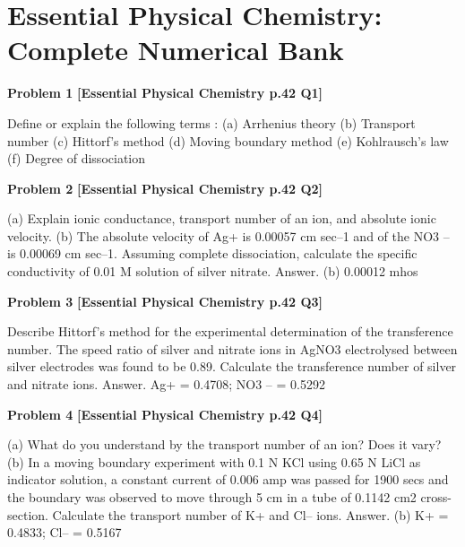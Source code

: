 \chapter{Essential Physical Chemistry: Complete Numerical Bank}
\label{chap:essential_all_questions}

\begin{problembox}
\textbf{Problem 1} \hfill \textbf{[Essential Physical Chemistry p.42 Q1]}
\label{q:ext-essential_all_questions-1}

Define or explain the following terms :
(a)
Arrhenius theory
(b)
Transport number
(c)
Hittorf's method
(d)
Moving boundary method
(e)
Kohlrausch's law
(f)
Degree of dissociation
\end{problembox}

\begin{problembox}
\textbf{Problem 2} \hfill \textbf{[Essential Physical Chemistry p.42 Q2]}
\label{q:ext-essential_all_questions-2}

(a)
Explain ionic conductance, transport number of an ion, and absolute ionic velocity.
(b)
The absolute velocity of Ag+ is 0.00057 cm sec--1 and of the NO3
-- is 0.00069 cm sec--1. Assuming
complete dissociation, calculate the specific conductivity of 0.01 M solution of silver nitrate.
Answer. (b) 0.00012 mhos
\end{problembox}

\begin{problembox}
\textbf{Problem 3} \hfill \textbf{[Essential Physical Chemistry p.42 Q3]}
\label{q:ext-essential_all_questions-3}

Describe Hittorf's method for the experimental determination of the transference number. The speed
ratio of silver and nitrate ions in AgNO3 electrolysed between silver electrodes was found to be 0.89.
Calculate the transference number of silver and nitrate ions.
Answer. Ag+ = 0.4708; NO3
-- = 0.5292
\end{problembox}

\begin{problembox}
\textbf{Problem 4} \hfill \textbf{[Essential Physical Chemistry p.42 Q4]}
\label{q:ext-essential_all_questions-4}

(a)
What do you understand by the transport number of an ion? Does it vary?
(b)
In a moving boundary experiment with 0.1 N KCl using 0.65 N LiCl as indicator solution, a
constant current of 0.006 amp was passed for 1900 secs and the boundary was observed to move
through 5 cm in a tube of 0.1142 cm2 cross-section. Calculate the transport number of K+ and Cl--
ions.
Answer. (b) K+ = 0.4833; Cl-- = 0.5167
\end{problembox}


